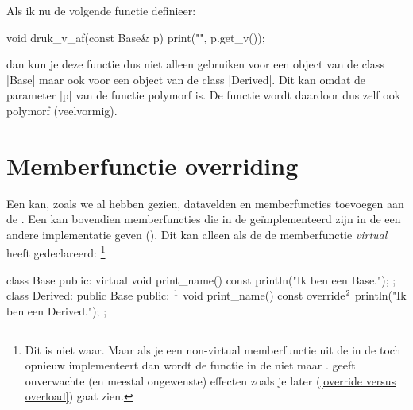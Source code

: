 \begin{cpplstShortInline}
Als ik nu de volgende functie definieer:
\begin{cpplstfragment}
void druk_v_af(const Base& p) {
    print("{}", p.get_v());
}
\end{cpplstfragment}
dan kun je deze functie dus niet alleen gebruiken voor een object van de class |Base| maar ook voor een object van de class |Derived|.
Dit kan omdat de parameter |p| van de functie polymorf is.
De functie wordt daardoor dus zelf ook polymorf (veelvormig).

\section{Memberfunctie overriding}
\label{sec:memberfunctieoverriding}
Een  kan, zoals we al hebben gezien, datavelden en memberfuncties toevoegen aan de .
Een  kan bovendien memberfuncties die in de  geïmplementeerd zijn in de  een andere implementatie geven (\label{overridden}\emph{}).
Dit kan alleen als de  de memberfunctie \emph{virtual}\label{virtual} heeft gedeclareerd:%
\footnote{%
    Dit is niet waar. 
    Maar als je een non-virtual memberfunctie uit de  in de  toch opnieuw implementeert dan wordt de functie in de  niet  maar .
     geeft onverwachte (en meestal ongewenste) effecten zoals je later (\cref{override versus overload}) gaat zien.
}
\begin{cpplstfragment}[mathescape=true]
class Base {
public:
    virtual void print_name() const {
        println("Ik ben een Base.");
    }
};
class Derived: public Base {
public:
    $\footnotemark%
    \makeatletter%
    \global\let\saved@Href@E\Hy@footnote@currentHref%
    \makeatother$ void print_name() const override$\footnotemark
        \makeatletter%
        \global\let\saved@Href@F\Hy@footnote@currentHref%
        \makeatother$ {
        println("Ik ben een Derived.");
    }
};
\end{cpplstfragment}%
\addtocounter{footnote}{-1}
\makeatletter\let\Hy@footnote@currentHref\saved@Href@E\makeatother 
\addtocounter{BackrefHyperFootnoteCounter}{-1}
\xdef\BackrefFootnoteTag{bhfn:\theBackrefHyperFootnoteCounter}
\end{cpplstShortInline}
